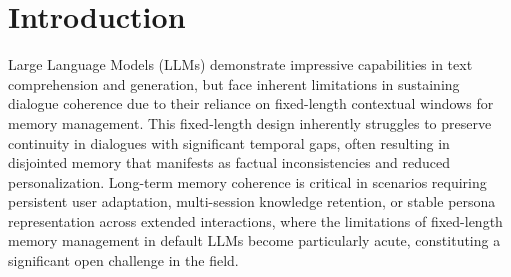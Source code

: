 \documentclass[11pt]{article}
\begin{document}

\section{Introduction}

Large Language Models (LLMs) demonstrate impressive capabilities in text comprehension and generation, but face inherent limitations in sustaining dialogue coherence due to their reliance on fixed-length contextual windows for memory management.
This fixed-length design inherently struggles to preserve continuity in dialogues with significant temporal gaps, often resulting in disjointed memory that manifests as factual inconsistencies and reduced personalization. 
Long-term memory coherence is critical in scenarios requiring persistent user adaptation, multi-session knowledge retention, or stable persona representation across extended interactions, where the limitations of fixed-length memory management in default LLMs become particularly acute, constituting a significant open challenge in the field.
\end{document}
